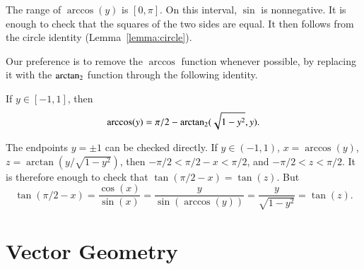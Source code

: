 \begin{proved}
    The range of $\arccos(y)$ is $[0,\pi]$.  On this interval, $\sin$
    is nonnegative.  It is enough to check that the squares of the two sides are equal.  It then follows from the circle identity
    (Lemma~\ref{lemma:circle}).
\swallowed\end{proved}


Our preference is to remove the $\arccos$ function whenever
possible, by replacing it with the ${\operatorname{arctan_2}}$ function through the
following identity.  


\begin{lemma}\label{lemma:arccos-arctan}  
If $y\in [-1,1]$, then
    $$\arccos(y) = \pi/2 - {\operatorname{arctan_2}}({ \sqrt{1-y^2}},{y}).$$
\end{lemma}

\begin{proved}
The endpoints $y=\pm1$ can be checked directly.
If $y\in (-1,1)$,  $x = \arccos(y)$, 
$z = \arctan(y/\sqrt{1-y^2})$, then
    $-\pi/2 < \pi/2 - x < \pi/2$, and $-\pi/2 < z < \pi/2$.  It is
    therefore enough to check that
        $\tan(\pi/2 - x) = \tan(z)$.
    But
        $$\tan(\pi/2-x) = \frac{\cos(x)}{\sin(x)} = \frac{y}{
        \sin(\arccos(y))} = \frac{y}{ \sqrt{1-y^2}} = \tan(z).$$
\swallowed\end{proved}

%





\section{Vector Geometry}

